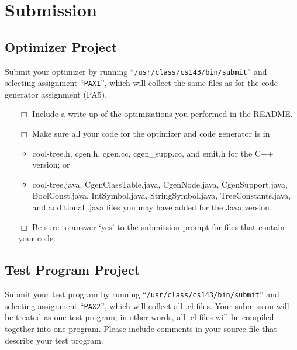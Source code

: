 \documentclass[11pt]{article}
\def\U#1{{\sf{}#1}}
\begin{document}
\section{Submission}

\subsection{Optimizer Project}

Submit your optimizer by running ``{\tt /usr/class/cs143/bin/submit}'' 
and selecting assignment ``{\tt PAX1}'', which will collect
the same files as for the code generator assignment (PA5).

\begin{minipage}{0.8\linewidth}
\bigskip
\begin{itemize}
  \item[$\Box$]
    Include a write-up of the optimizations you performed in the \U{README}.

  \item[$\Box$]
    Make sure all your code for the optimizer and code generator is in
    \begin{itemize}
    \item \U{cool-tree.h}, \U{cgen.h},
          \U{cgen.cc}, \U{cgen\_supp.cc}, and \U{emit.h} for the
          C++ version; or
    \item \U{cool-tree.java}, \U{CgenClassTable.java},
          \U{CgenNode.java}, \U{CgenSupport.java}, \U{BoolConst.java},
          \U{IntSymbol.java}, \U{StringSymbol.java},
          \U{TreeConstants.java}, and additional \U{.java} files you
          may have added for the Java version.
    \end{itemize}

  \item[$\Box$]
    Be sure to answer `yes' to the submission prompt for files that contain
    your code.
\end{itemize}
\end{minipage}


\subsection{Test Program Project}

Submit your test program by running ``{\tt /usr/class/cs143/bin/submit}'' 
and selecting assignment ``{\tt PAX2}'', which will collect
all \U{.cl} files.  Your submission will be treated as one test
program; in other words, all \U{.cl} files will be compiled together
into one program.  Please include comments in your source file that
describe your test program.
\end{document}
